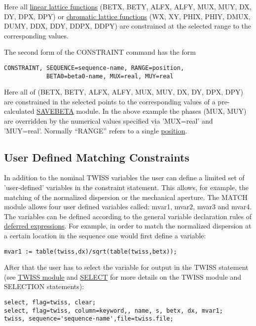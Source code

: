 Here all \href{../Introduction/tables.html#linear}{linear lattice functions} 
(BETX, BETY, ALFX, ALFY, MUX, MUY, DX, DY, DPX, DPY)
or \href{../Introduction/tables.html#chrom}{chromatic lattice functions}
(WX, XY, PHIX, PHIY, DMUX, DUMY, DDX, DDY, DDPX, DDPY)
are constrained at the selected range to the corresponding values.

The second form of the CONSTRAINT command has the form
\begin{verbatim}
CONSTRAINT, SEQUENCE=sequence-name, RANGE=position,
            BETA0=beta0-name, MUX=real, MUY=real
\end{verbatim}

Here all of (BETX, BETY, ALFX, ALFY, MUX, MUY, DX, DY, DPX, DPY)
are constrained in the selected points to the corresponding values
of a pre-calculated \href{../control/general.html#savebeta}{SAVEBETA} module.
In the above example
the phases (MUX, MUY) are overridden by the numerical values specified via
'MUX=real' and 'MUY=real'.
Normally ``RANGE'' refers to a single
\href{../Introduction/ranges.html#position}{position}.

\subsection{User Defined Matching Constraints}
\label{subsec:match_con_user}

In addition to the nominal TWISS variables the user can define a limited
set of 'user-defined' variables in the constraint statement. This
allows, for example, the matching of the normalized dispersion or the
mechanical aperture. The MATCH module allows four user defined variables
called: mvar1, mvar2, mvar3 and mvar4. 
The variables can be defined according to the general variable
declaration rules of  
\href{../Introduction/expression.html#defer}{deferred expressions}.
For example, in order to match the normalized dispersion at a certain
location in the sequence one would first define a variable:

\begin{verbatim}
mvar1 := table(twiss,dx)/sqrt(table(twiss,betx));
\end{verbatim}

After that the user has to select the variable for output in the TWISS
statement (see \href{../twiss/twiss.html}{TWISS module} and
\href{../Introduction/select.html}{SELECT} for more
details on the TWISS module and SELECTION statements):
\begin{verbatim}
select, flag=twiss, clear;
select, flag=twiss, column=keyword,, name, s, betx, dx, mvar1;
twiss, sequence='sequence-name',file=twiss.file;
\end{verbatim}

